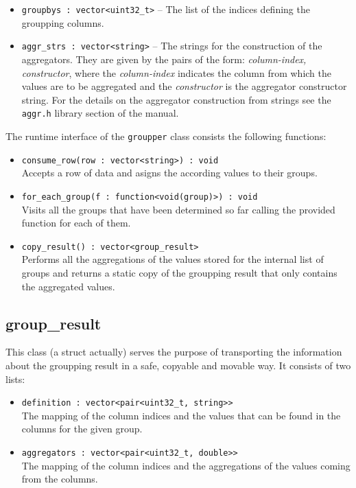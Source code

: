 \documentclass{report}
\begin{document}
	\begin{itemize}
		\item \texttt{groupbys : vector<uint32\_t>} -- The list of the
			indices defining the groupping columns.
		\item \texttt{aggr\_strs : vector<string>} -- The strings for
			the construction of the aggregators. They are given by
			the pairs of the form: \textit{column-index, constructor},
			where the \textit{column-index} indicates the column from
			which the values are to be aggregated and the
			\textit{constructor} is the aggregator constructor string.
			For the details on the aggregator construction from strings
			see the \texttt{aggr.h} library section of the manual.
	\end{itemize}

	The runtime interface of the \texttt{groupper} class consists the following
	functions:

	\begin{itemize}
		\item \texttt{consume\_row(row : vector<string>) : void}\\
			Accepts a row of data and asigns the according values to
			their groups.
		\item \texttt{for\_each\_group(f : function<void(group)>) : void}\\
			Visits all the groups that have been determined so far
			calling the provided function for each of them.
		\item \texttt{copy\_result() : vector<group\_result>}\\
			Performs all the aggregations of the values stored for the
			internal list of groups and returns a static copy of
			the groupping result that only contains the aggregated
			values.
	\end{itemize}

	\subsection{group\_result}
	This class (a struct actually) serves the purpose of transporting the
	information about the groupping result in a safe, copyable and movable
	way. It consists of two lists:

	\begin{itemize}
		\item \texttt{definition : vector<pair<uint32\_t, string>>}\\
			The mapping of the column indices and the values that
			can be found in the columns for the given group.
		\item \texttt{aggregators : vector<pair<uint32\_t, double>>}\\
			The mapping of the column indices and the aggregations
			of the values coming from the columns.
	\end{itemize}
\end{document}
